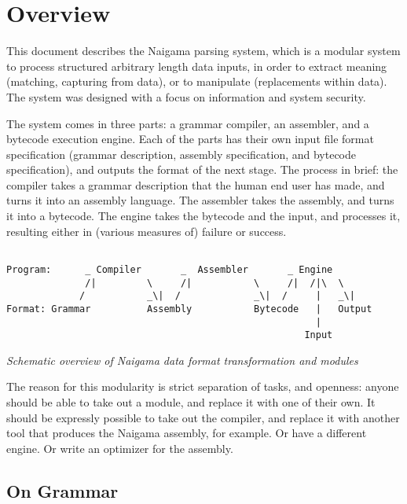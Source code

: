 \section{Overview}

This document describes the Naigama parsing system, which is a 
modular system to process structured arbitrary length data inputs,
in order to extract meaning (matching, capturing from data), or to
manipulate (replacements within data).
The system was designed with a focus on information and system security.

The system comes in three parts: a grammar compiler, an assembler,
and a bytecode execution engine. Each of the parts has their own
input file format specification (grammar description, assembly specification,
and bytecode specification), and outputs the format of the next stage.
The process in brief: the compiler takes a
grammar description that the human end user has made, and turns it into
an assembly language. The assembler takes the assembly, and turns it
into a bytecode. The engine takes the bytecode and the input, and
processes it, resulting either in (various measures of) failure or
success.

\begin{myquote}
\begin{verbatim}

Program:      _ Compiler       _  Assembler       _ Engine
              /|         \     /|           \     /|  /|\  \
             /           _\|  /             _\|  /     |   _\|
Format: Grammar          Assembly           Bytecode   |   Output
                                                       |
                                                     Input

\end{verbatim}
\end{myquote}
\textit{Schematic overview of Naigama data format transformation and modules}

The reason for this modularity is strict separation of tasks, and openness:
anyone should be able to take out a module, and replace it with one
of their own.
It should be expressly possible to take out the compiler, and replace
it with another tool that produces the Naigama assembly, for example.
Or have a different engine. Or write an optimizer for the assembly.

\subsection{On Grammar}
  
